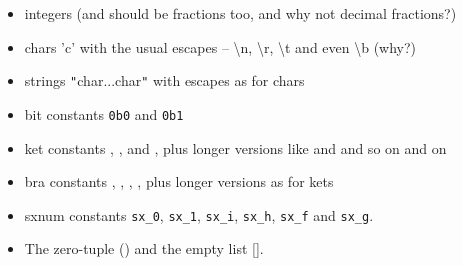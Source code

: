 \documentclass[11pt,a4paper]{article}
\newcommand{\verbtt}[1]{\texttt{\small{}#1}}
\begin{document}
\begin{itemize}
\item integers (and should be fractions too, and why not decimal fractions?)
\item chars 'c' with the usual escapes -- \textbackslash{n}, \textbackslash{r}, \textbackslash{t} and even \textbackslash{b} (why?)
\item strings \verbtt{"}char...char\verbtt{"} with escapes as for chars 
\item bit constants \verbtt{0b0} and \verbtt{0b1}
\item ket constants \zero, \one, \plus{} and \minus, plus longer versions like  and \bv{+-+} and so on and on
\item bra constants , , \vb{+}, \vb{-}, plus longer versions as for kets 
\item sxnum constants \verbtt{sx\_0}, \verbtt{sx\_1}, \verbtt{sx\_i}, \verbtt{sx\_h}, \verbtt{sx\_f} and \verbtt{sx\_g}.
\item The zero-tuple () and the empty list [].

\end{itemize}
 

 
\end{document}
